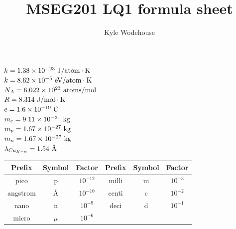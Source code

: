\documentclass{article}
\author{Kyle Wodehouse}
\title{MSEG201 LQ1 formula sheet}
\begin{document}
\maketitle

\raggedright
\begin{multicols}{3}
    $k = 1.38 \times 10^{-23} \ \textnormal{J/atom} \cdot \textnormal{K}$ \\
    $k = 8.62 \times 10^{-5} \ \textnormal{eV/atom} \cdot \textnormal{K}$ \\
    $N_A = 6.022 \times 10^{23} \ \textnormal{atoms/mol}$ \\
    $R = 8.314 \ \textnormal{J/mol} \cdot \textnormal{K}$ \\
    $e = 1.6 \times 10^{-19} \ \textnormal{C}$ \\
    $m_e = 9.11 \times 10^{-31} \ \textnormal{kg}$ \\
    $m_p = 1.67 \times 10^{-27} \ \textnormal{kg}$ \\
    $m_n = 1.67 \times 10^{-27} \ \textnormal{kg}$ \\
    $\lambda_{Cu_{K-\alpha}} = 1.54 \ \textnormal{\AA}$ \\
\end{multicols}



\begin{table}[H]
    \centering
    \begin{tabular}{ c c c | c c c }
        Prefix & Symbol & Factor & Prefix & Symbol & Factor \\
        \toprule
        pico & p & $10^{-12}$ & milli & m & $10^{-3}$ \\
        angstrom & \AA & $10^{-10}$ & centi & c & $10^{-2}$ \\
        nano & n & $10^{-9}$ & deci & d & $10^{-1}$ \\
        micro & $\mu$ & $10^{-6}$ &  &  &  \\
    \end{tabular}
\end{table}
\end{document}
